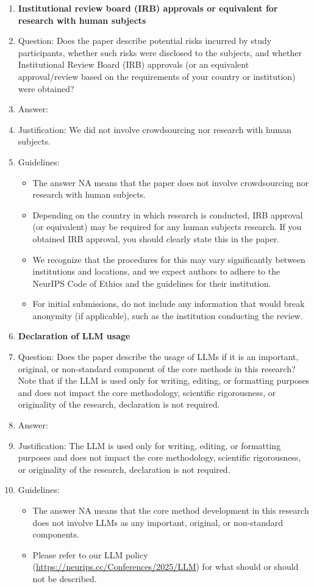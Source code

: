 \documentclass{article}
\theoremstyle{plain}
\theoremstyle{definition}
\theoremstyle{remark}
\begin{document}
\begin{enumerate}
\item {\bf Institutional review board (IRB) approvals or equivalent for research with human subjects}
    \item[] Question: Does the paper describe potential risks incurred by study participants, whether such risks were disclosed to the subjects, and whether Institutional Review Board (IRB) approvals (or an equivalent approval/review based on the requirements of your country or institution) were obtained?
    \item[] Answer: \answerNA{} %
    \item[] Justification: We did not involve crowdsourcing nor research with human subjects.
    \item[] Guidelines:
    \begin{itemize}
        \item The answer NA means that the paper does not involve crowdsourcing nor research with human subjects.
        \item Depending on the country in which research is conducted, IRB approval (or equivalent) may be required for any human subjects research. If you obtained IRB approval, you should clearly state this in the paper. 
        \item We recognize that the procedures for this may vary significantly between institutions and locations, and we expect authors to adhere to the NeurIPS Code of Ethics and the guidelines for their institution. 
        \item For initial submissions, do not include any information that would break anonymity (if applicable), such as the institution conducting the review.
    \end{itemize}

\item {\bf Declaration of LLM usage}
    \item[] Question: Does the paper describe the usage of LLMs if it is an important, original, or non-standard component of the core methods in this research? Note that if the LLM is used only for writing, editing, or formatting purposes and does not impact the core methodology, scientific rigorousness, or originality of the research, declaration is not required.
    \item[] Answer: \answerNA{} %
    \item[] Justification: The LLM is used only for writing, editing, or formatting purposes and does not impact the core methodology, scientific rigorousness, or originality of the research, declaration is not required.
    \item[] Guidelines:
    \begin{itemize}
        \item The answer NA means that the core method development in this research does not involve LLMs as any important, original, or non-standard components.
        \item Please refer to our LLM policy (\url{https://neurips.cc/Conferences/2025/LLM}) for what should or should not be described.
    \end{itemize}

\end{enumerate}
\end{document}
